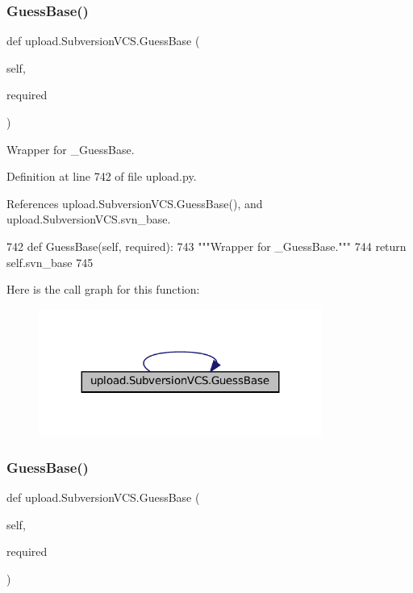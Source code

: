 \subsubsection{\texorpdfstring{Guess\+Base()}{GuessBase()}\hspace{0.1cm}{\footnotesize\ttfamily [1/2]}}
{\footnotesize\ttfamily def upload.\+Subversion\+V\+C\+S.\+Guess\+Base (\begin{DoxyParamCaption}\item[{}]{self,  }\item[{}]{required }\end{DoxyParamCaption})}

\begin{DoxyVerb}Wrapper for _GuessBase.\end{DoxyVerb}
 

Definition at line 742 of file upload.\+py.



References upload.\+Subversion\+V\+C\+S.\+Guess\+Base(), and upload.\+Subversion\+V\+C\+S.\+svn\+\_\+base.


\begin{DoxyCode}
742   \textcolor{keyword}{def }GuessBase(self, required):
743     \textcolor{stringliteral}{"""Wrapper for \_GuessBase."""}
744     \textcolor{keywordflow}{return} self.svn\_base
745 
\end{DoxyCode}
Here is the call graph for this function\+:
\nopagebreak
\begin{figure}[H]
\begin{center}
\leavevmode
\includegraphics[width=263pt]{classupload_1_1SubversionVCS_a7d22d459469a757270502ce0dccacbd2_cgraph}
\end{center}
\end{figure}
\mbox{\label{classupload_1_1SubversionVCS_a7d22d459469a757270502ce0dccacbd2}} 
\subsubsection{\texorpdfstring{Guess\+Base()}{GuessBase()}\hspace{0.1cm}{\footnotesize\ttfamily [2/2]}}
{\footnotesize\ttfamily def upload.\+Subversion\+V\+C\+S.\+Guess\+Base (\begin{DoxyParamCaption}\item[{}]{self,  }\item[{}]{required }\end{DoxyParamCaption})}

